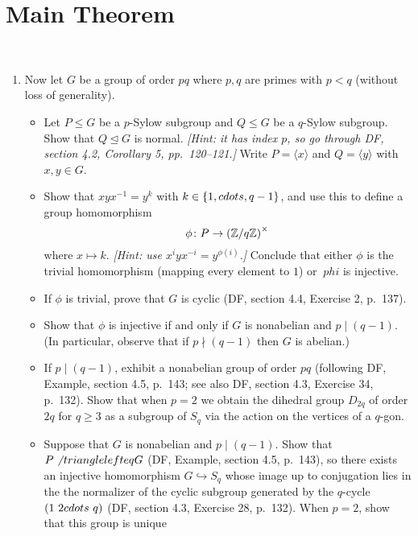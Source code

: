 \section{Main Theorem}~\label{sec:main-theorem}

\begin{Answer}
  \begin{enumerate}
    \item Now let $G$ be a group of order $pq$ where $p,q$ are primes with $p < q$ 
    (without loss of generality).  
    \begin{itemize}
    \item Let $P \leq G$ be a $p$-Sylow subgroup and $Q \leq G$ be a $q$-Sylow 
    subgroup.  Show that $Q \trianglelefteq G$ is normal.  \emph{[Hint: it has index 
    $p$, so go through DF, section 4.2, Corollary 5, pp.~120--121.]}  Write $P=\langle 
    x \rangle$ and $Q=\langle y \rangle$ with $x,y \in G$.
    \item Show that $xyx^{-1}=y^k$ with $k \in \{1,\\cdots,q-1\}$, and use this to define
    a group homomorphism
    \[ \phi \colon P \to {(\mathbb{Z}/q\mathbb{Z})}^\times \]
    where $x \mapsto k$.  \emph{[Hint: use $x^i y x^{-i} = y^{\phi(i)}$.]}  Conclude 
    that either $\phi$ is the trivial homomorphism (mapping every element to $1$) or $\
    phi$ is injective.
    \item If $\phi$ is trivial, prove that $G$ is cyclic (DF, section 4.4, Exercise 2, 
    p.~137).
    \item Show that $\phi$ is injective if and only if $G$ is nonabelian and $p \mid 
    (q-1)$.  (In particular, observe that if $p \nmid (q-1)$ then $G$ is abelian.)
    \item If $p \mid (q-1)$, exhibit a nonabelian group of order $pq$ (following DF, 
    Example, section 4.5, p.~143; see also DF, section 4.3, Exercise 34, p.~132).  Show
    that when $p=2$ we obtain the dihedral group $D_{2q}$ of order $2q$ for $q \geq 3$ 
    as a subgroup of $S_q$ via the action on the vertices of a $q$-gon.
    \item Suppose that $G$ is nonabelian and $p \mid (q-1)$.  Show that $P \not\
    trianglelefteq G$ (DF, Example, section 4.5, p.~143), so there exists an injective 
    homomorphism $G \hookrightarrow S_q$ whose image up to conjugation lies in the the 
    normalizer of the cyclic subgroup generated by the $q$-cycle $(1\ 2\ \\cdots \ q)$ 
    (DF, section 4.3, Exercise 28, p.~132).  When $p=2$, show that this group is unique

\end{itemize}
\end{enumerate}
\end{Answer}
